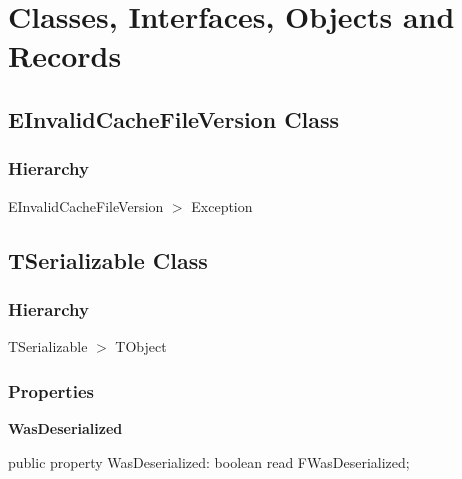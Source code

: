 \documentclass{report}
\newif\ifpdf
\begin{document}
\section{Classes, Interfaces, Objects and Records}
\ifpdf
\subsection*{\large{\textbf{EInvalidCacheFileVersion Class}}\normalsize\hspace{1ex}\hrulefill}
\else
\subsection*{EInvalidCacheFileVersion Class}
\fi
\label{PasDoc_Serialize.EInvalidCacheFileVersion}
\subsubsection*{\large{\textbf{Hierarchy}}\normalsize\hspace{1ex}\hfill}
EInvalidCacheFileVersion {$>$} Exception
\ifpdf
\subsection*{\large{\textbf{TSerializable Class}}\normalsize\hspace{1ex}\hrulefill}
\else
\subsection*{TSerializable Class}
\fi
\label{PasDoc_Serialize.TSerializable}
\subsubsection*{\large{\textbf{Hierarchy}}\normalsize\hspace{1ex}\hfill}
TSerializable {$>$} TObject
\subsubsection*{\large{\textbf{Properties}}\normalsize\hspace{1ex}\hfill}
\begin{list}{}{
\setlength{\itemindent}{0cm}
\setlength{\listparindent}{0cm}
\setlength{\leftmargin}{\evensidemargin}
\addtolength{\leftmargin}{\tmplength}
\settowidth{\labelsep}{X}
\addtolength{\leftmargin}{\labelsep}
\setlength{\labelwidth}{\tmplength}
}
\label{PasDoc_Serialize.TSerializable-WasDeserialized}
\item[\textbf{WasDeserialized}\hfill]
\ifpdf
\begin{flushleft}
\fi
\begin{ttfamily}
public property WasDeserialized: boolean read FWasDeserialized;\end{ttfamily}

\ifpdf
\end{flushleft}
\fi


\par  \end{list}
\end{document}
